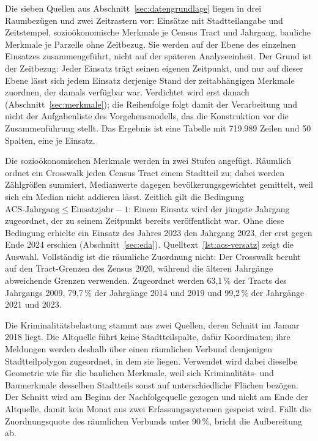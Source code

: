 Die sieben Quellen aus Abschnitt~\ref{sec:datengrundlage} liegen in drei
Raumbezügen und zwei Zeitrastern vor: Einsätze mit Stadtteilangabe und
Zeitstempel, sozioökonomische Merkmale je Census Tract und Jahrgang, bauliche
Merkmale je Parzelle ohne Zeitbezug. Sie werden auf der Ebene des einzelnen
Einsatzes zusammengeführt, nicht auf der späteren Analyseeinheit. Der Grund ist
der Zeitbezug: Jeder Einsatz trägt seinen eigenen Zeitpunkt, und nur auf dieser
Ebene lässt sich jedem Einsatz derjenige Stand der zeitabhängigen Merkmale
zuordnen, der damals verfügbar war. Verdichtet wird erst danach
(Abschnitt~\ref{sec:merkmale}); die Reihenfolge folgt damit der Verarbeitung
und nicht der Aufgabenliste des Vorgehensmodells, das die Konstruktion vor die
Zusammenführung stellt. Das Ergebnis ist eine Tabelle mit 719.989 Zeilen und
50 Spalten, eine je Einsatz.

Die sozioökonomischen Merkmale werden in zwei Stufen angefügt. Räumlich ordnet
ein Crosswalk jeden Census Tract einem Stadtteil zu; dabei werden Zählgrößen
summiert, Medianwerte dagegen bevölkerungsgewichtet gemittelt, weil sich ein
Median nicht addieren lässt. Zeitlich gilt die Bedingung
$\text{ACS-Jahrgang} \le \text{Einsatzjahr} - 1$: Einem Einsatz wird der
jüngste Jahrgang zugeordnet, der zu seinem Zeitpunkt bereits veröffentlicht
war. Ohne diese Bedingung erhielte ein Einsatz des Jahres 2023 den Jahrgang
2023, der erst gegen Ende 2024 erschien (Abschnitt~\ref{sec:eda}).
Quelltext~\ref{lst:acs-versatz} zeigt die Auswahl. Vollständig ist die
räumliche Zuordnung nicht: Der Crosswalk beruht auf den Tract-Grenzen des
Zensus 2020, während die älteren Jahrgänge abweichende Grenzen verwenden.
Zugeordnet werden 63,1\,\% der Tracts des Jahrgangs 2009, 79,7\,\% der
Jahrgänge 2014 und 2019 und 99,2\,\% der Jahrgänge 2021 und 2023.

Die Kriminalitätsbelastung stammt aus zwei Quellen, deren Schnitt im Januar
2018 liegt. Die Altquelle führt keine Stadtteilspalte, dafür Koordinaten; ihre
Meldungen werden deshalb über einen räumlichen Verbund demjenigen
Stadtteilpolygon zugeordnet, in dem sie liegen. Verwendet wird dabei dieselbe
Geometrie wie für die baulichen Merkmale, weil sich Kriminalitäts- und
Baumerkmale desselben Stadtteils sonst auf unterschiedliche Flächen bezögen.
Der Schnitt wird am Beginn der Nachfolgequelle gezogen und nicht am Ende der
Altquelle, damit kein Monat aus zwei Erfassungssystemen gespeist wird. Fällt
die Zuordnungsquote des räumlichen Verbunds unter 90\,\%, bricht die
Aufbereitung ab.


